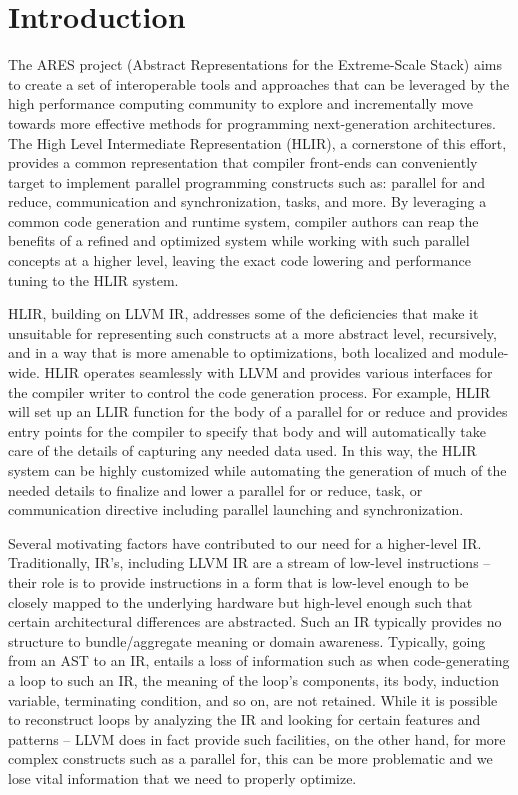 \documentclass[12pt]{article}
\begin{document}
\maketitle

\section{Introduction}

The ARES project (Abstract Representations for the Extreme-Scale Stack) aims to create a set of interoperable tools and approaches that can be leveraged by the high performance computing community to explore and incrementally move towards more effective methods for programming next-generation architectures. The High Level Intermediate Representation (HLIR), a cornerstone of this effort, provides a common representation that compiler front-ends can conveniently target to implement parallel programming constructs such as: parallel for and reduce, communication and synchronization, tasks, and more. By leveraging a common code generation and runtime system, compiler authors can reap the benefits of a refined and optimized system while working with such parallel concepts at a higher level, leaving the exact code lowering and performance tuning to the HLIR system.

HLIR, building on LLVM IR, addresses some of the deficiencies that make it unsuitable for representing such constructs at a more abstract level, recursively, and in a way that is more amenable to optimizations, both localized and module-wide. HLIR operates seamlessly with LLVM and provides various interfaces for the compiler writer to control the code generation process. For example, HLIR will set up an LLIR function for the body of a parallel for or reduce and provides entry points for the compiler to specify that body and will automatically take care of the details of capturing any needed data used. In this way, the HLIR system can be highly customized while automating the generation of much of the needed details to finalize and lower a parallel for or reduce, task, or communication directive including parallel launching and synchronization.

Several motivating factors have contributed to our need for a higher-level IR. Traditionally, IR's, including LLVM IR are a stream of low-level instructions -- their role is to provide instructions in a form that is low-level enough to be closely mapped to the underlying hardware but high-level enough such that certain architectural differences are abstracted. Such an IR typically provides no structure to bundle/aggregate meaning or domain awareness. Typically, going from an AST to an IR, entails a loss of information such as when code-generating a loop to such an IR, the meaning of the loop's components, its body, induction variable, terminating condition, and so on, are not retained. While it is possible to reconstruct loops by analyzing the IR and looking for certain features and patterns -- LLVM does in fact provide such facilities, on the other hand, for more complex constructs such as a parallel for, this can be more problematic and we lose vital information that we need to properly optimize.
\end{document}
